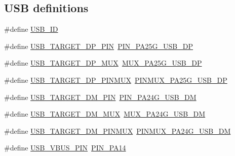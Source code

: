 \subsection*{U\+SB definitions}
\begin{DoxyCompactItemize}
\item 
\#define \mbox{\hyperlink{group__samd21__xplained__pro__features__group_gade1af4ebab8628311834baeea376350c}{U\+S\+B\+\_\+\+ID}}
\item 
\#define \mbox{\hyperlink{group__samd21__xplained__pro__features__group_gaac2fbb45d72d2ff1508ceacdb237d03f}{U\+S\+B\+\_\+\+T\+A\+R\+G\+E\+T\+\_\+\+D\+P\+\_\+\+P\+IN}}~\mbox{\hyperlink{pio_2samd21j18a_8h_ad3209fce355391fa37fb9ee091037c99}{P\+I\+N\+\_\+\+P\+A25\+G\+\_\+\+U\+S\+B\+\_\+\+DP}}
\item 
\#define \mbox{\hyperlink{group__samd21__xplained__pro__features__group_ga1fe80f3fee58c45936740b202755d8b4}{U\+S\+B\+\_\+\+T\+A\+R\+G\+E\+T\+\_\+\+D\+P\+\_\+\+M\+UX}}~\mbox{\hyperlink{pio_2samd21j18a_8h_a3d922cd2e2cc8499575cbb952d1af504}{M\+U\+X\+\_\+\+P\+A25\+G\+\_\+\+U\+S\+B\+\_\+\+DP}}
\item 
\#define \mbox{\hyperlink{group__samd21__xplained__pro__features__group_ga290c6af6406b6e41ff022616537be3b5}{U\+S\+B\+\_\+\+T\+A\+R\+G\+E\+T\+\_\+\+D\+P\+\_\+\+P\+I\+N\+M\+UX}}~\mbox{\hyperlink{pio_2samd21j18a_8h_a6111cd9bfa47d39e140f48d041943860}{P\+I\+N\+M\+U\+X\+\_\+\+P\+A25\+G\+\_\+\+U\+S\+B\+\_\+\+DP}}
\item 
\#define \mbox{\hyperlink{group__samd21__xplained__pro__features__group_ga875ea014cfd19a7a60e27dd9f5fa54d9}{U\+S\+B\+\_\+\+T\+A\+R\+G\+E\+T\+\_\+\+D\+M\+\_\+\+P\+IN}}~\mbox{\hyperlink{pio_2samd21j18a_8h_a402ed7e21f4453f9c95d6acd4627003c}{P\+I\+N\+\_\+\+P\+A24\+G\+\_\+\+U\+S\+B\+\_\+\+DM}}
\item 
\#define \mbox{\hyperlink{group__samd21__xplained__pro__features__group_ga5b51bfdd1df608201dde0215a32c7d85}{U\+S\+B\+\_\+\+T\+A\+R\+G\+E\+T\+\_\+\+D\+M\+\_\+\+M\+UX}}~\mbox{\hyperlink{pio_2samd21j18a_8h_a584d5dc42d06b5df0b9e6c7dd5714cc2}{M\+U\+X\+\_\+\+P\+A24\+G\+\_\+\+U\+S\+B\+\_\+\+DM}}
\item 
\#define \mbox{\hyperlink{group__samd21__xplained__pro__features__group_ga3590903d24923c02d7c5560ce1e11939}{U\+S\+B\+\_\+\+T\+A\+R\+G\+E\+T\+\_\+\+D\+M\+\_\+\+P\+I\+N\+M\+UX}}~\mbox{\hyperlink{pio_2samd21j18a_8h_afbe712ab64bb60fa94edbc8facaade2f}{P\+I\+N\+M\+U\+X\+\_\+\+P\+A24\+G\+\_\+\+U\+S\+B\+\_\+\+DM}}
\item 
\#define \mbox{\hyperlink{group__samd21__xplained__pro__features__group_ga5e087011ca814d14f4a42be3b9621e1c}{U\+S\+B\+\_\+\+V\+B\+U\+S\+\_\+\+P\+IN}}~\mbox{\hyperlink{pio_2samd21j18a_8h_ad71083de279943a97f0a159c824c290b}{P\+I\+N\+\_\+\+P\+A14}}

\end{DoxyCompactItemize}
